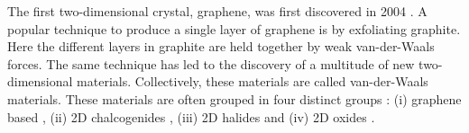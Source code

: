 The first two-dimensional crystal, graphene, was first discovered in 2004 \cite{novoselov_electric_2004}. A popular technique to produce a single layer of graphene is by exfoliating graphite. Here the different layers in graphite are held together by weak van-der-Waals forces. The same technique has led to the discovery of a multitude of new two-dimensional materials. Collectively, these materials are called van-der-Waals materials. These materials are often grouped in four distinct groups \cite{sethulakshmi_magnetism_2019,tsymbal_spintronics_2019, liu_chapter_2020}: (i) graphene based \cite{?}, (ii) 2D chalcogenides \cite{novoselov_two-dimensional_2005, yang_long-lived_2015, chhowalla_chemistry_2013, wang_electronics_2012-1, ugeda_characterization_2016, zhang_direct_2013, ma_evidence_2012, butler_progress_2013, zeng_valley_2012, xiao_coupled_2012, mak_atomically_2010, radisavljevic_single-layer_2011}, (iii) 2D halides \cite{?} and (iv) 2D oxides \cite{?}.

